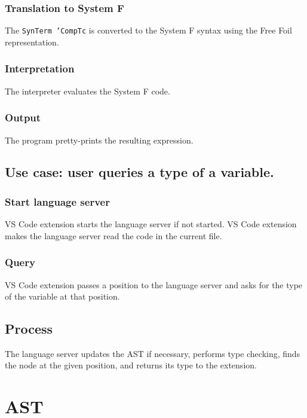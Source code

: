 \subsubsection{Translation to System F}

The \texttt{SynTerm 'CompTc} is converted to the System F syntax using the Free Foil representation.

\subsubsection{Interpretation}

The interpreter evaluates the System F code.

\subsubsection{Output}

The program pretty-prints the resulting expression.

\subsection{Use case: user queries a type of a variable.}

\subsubsection{Start language server}

VS Code extension starts the language server if not started.
VS Code extension makes the language server read the code in the current file.

\subsubsection{Query}

VS Code extension passes a position to the language server and asks for the type of the variable at that position.

\subsection{Process}

The language server updates the AST if necessary, performs type checking, finds the node at the given position, and returns its type to the extension.

\section{AST}

